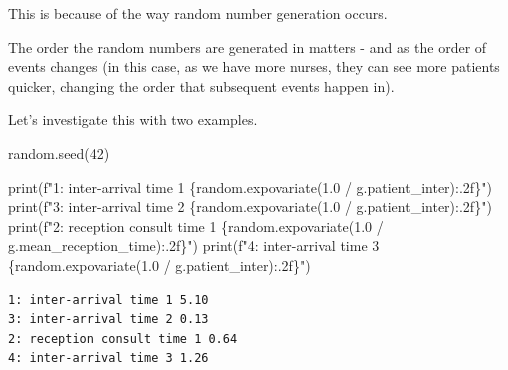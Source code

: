 \documentclass[
  letterpaper,
  DIV=11,
  numbers=noendperiod]{scrreprt}
\newenvironment{Shaded}{}{}
\newcommand{\BuiltInTok}[1]{\textcolor[rgb]{0.84,0.23,0.29}{#1}}
\newcommand{\DecValTok}[1]{\textcolor[rgb]{0.00,0.36,0.77}{#1}}
\newcommand{\FloatTok}[1]{\textcolor[rgb]{0.00,0.36,0.77}{#1}}
\newcommand{\NormalTok}[1]{\textcolor[rgb]{0.14,0.16,0.18}{#1}}
\newcommand{\OperatorTok}[1]{\textcolor[rgb]{0.14,0.16,0.18}{#1}}
\newcommand{\SpecialCharTok}[1]{\textcolor[rgb]{0.00,0.36,0.77}{#1}}
\newcommand{\SpecialStringTok}[1]{\textcolor[rgb]{0.01,0.18,0.38}{#1}}
\begin{document}
\begin{tcolorbox}[enhanced jigsaw, colframe=quarto-callout-note-color-frame, bottomtitle=1mm, breakable, rightrule=.15mm, coltitle=black, colbacktitle=quarto-callout-note-color!10!white, opacityback=0, leftrule=.75mm, arc=.35mm, toptitle=1mm, title=\textcolor{quarto-callout-note-color}{\faInfo}\hspace{0.5em}{Note}, titlerule=0mm, colback=white, toprule=.15mm, bottomrule=.15mm, left=2mm, opacitybacktitle=0.6]

This is because of the way random number generation occurs.

The order the random numbers are generated in matters - and as the order
of events changes (in this case, as we have more nurses, they can see
more patients quicker, changing the order that subsequent events happen
in).

Let's investigate this with two examples.

\begin{Shaded}
\begin{Highlighting}[]
\NormalTok{random.seed(}\DecValTok{42}\NormalTok{)}

\BuiltInTok{print}\NormalTok{(}\SpecialStringTok{f"1: inter{-}arrival time 1 }\SpecialCharTok{\{}\NormalTok{random}\SpecialCharTok{.}\NormalTok{expovariate(}\FloatTok{1.0} \OperatorTok{/}\NormalTok{ g.patient\_inter)}\SpecialCharTok{:.2f\}}\SpecialStringTok{"}\NormalTok{)}
\BuiltInTok{print}\NormalTok{(}\SpecialStringTok{f"3: inter{-}arrival time 2 }\SpecialCharTok{\{}\NormalTok{random}\SpecialCharTok{.}\NormalTok{expovariate(}\FloatTok{1.0} \OperatorTok{/}\NormalTok{ g.patient\_inter)}\SpecialCharTok{:.2f\}}\SpecialStringTok{"}\NormalTok{)}
\BuiltInTok{print}\NormalTok{(}\SpecialStringTok{f"2: reception consult time 1 }\SpecialCharTok{\{}\NormalTok{random}\SpecialCharTok{.}\NormalTok{expovariate(}\FloatTok{1.0} \OperatorTok{/}\NormalTok{ g.mean\_reception\_time)}\SpecialCharTok{:.2f\}}\SpecialStringTok{"}\NormalTok{)}
\BuiltInTok{print}\NormalTok{(}\SpecialStringTok{f"4: inter{-}arrival time 3 }\SpecialCharTok{\{}\NormalTok{random}\SpecialCharTok{.}\NormalTok{expovariate(}\FloatTok{1.0} \OperatorTok{/}\NormalTok{ g.patient\_inter)}\SpecialCharTok{:.2f\}}\SpecialStringTok{"}\NormalTok{)}
\end{Highlighting}
\end{Shaded}

\begin{verbatim}
1: inter-arrival time 1 5.10
3: inter-arrival time 2 0.13
2: reception consult time 1 0.64
4: inter-arrival time 3 1.26
\end{verbatim}


\end{tcolorbox}
\end{document}
